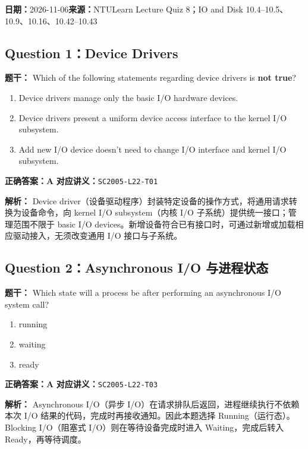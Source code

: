 \documentclass[11pt,a4paper,fontset=fandol]{ctexart}
\renewcommand{\exercisequestion}[2]{%
  \Needspace{5\baselineskip}%
  \subsection{#2}\label{exercise:#1}%
}
\renewcommand{\exercisemeta}[5]{%
  {\small\textbf{日期：}#2\quad\textbf{来源：}#3\par}%
}
\renewenvironment{checkedsolution}
  {\par\nopagebreak[4]\textbf{解析：}\ignorespaces}
  {\par}
\begin{document}
\exercisemeta
  {SC2005-HW08}
  {2026-11-06}
  {NTULearn Lecture Quiz 8；IO and Disk 10.4--10.5、10.9、10.16、10.42--10.43}
  {五道题已完成，并根据讲义与平台反馈核对}
  {是（2026-11-06）}

\exercisequestion{SC2005-HW08-Q01}{Question 1：Device Drivers}

\textbf{题干：} Which of the following statements regarding device drivers is \textbf{not true}?

\begin{enumerate}[label=\Alph*.,leftmargin=2.4em]
  \item Device drivers manage only the basic I/O hardware devices.
  \item Device drivers present a uniform device access interface to the kernel I/O subsystem.
  \item Add new I/O device doesn't need to change I/O interface and kernel I/O subsystem.
\end{enumerate}

\textbf{正确答案：A}\qquad
\textbf{对应讲义：}\texttt{SC2005-L22-T01}

\begin{checkedsolution}
Device driver（设备驱动程序）封装特定设备的操作方式，将通用请求转换为设备命令，向 kernel I/O subsystem（内核 I/O 子系统）提供统一接口；管理范围不限于 basic I/O devices。新增设备符合已有接口时，可通过新增或加载相应驱动接入，无须改变通用 I/O 接口与子系统。
\end{checkedsolution}

\exercisequestion{SC2005-HW08-Q02}{Question 2：Asynchronous I/O 与进程状态}

\textbf{题干：} Which state will a process be after performing an asynchronous I/O system call?

\begin{enumerate}[label=\Alph*.,leftmargin=2.4em]
  \item running
  \item waiting
  \item ready
\end{enumerate}

\textbf{正确答案：A}\qquad
\textbf{对应讲义：}\texttt{SC2005-L22-T03}

\begin{checkedsolution}
Asynchronous I/O（异步 I/O）在请求排队后返回，进程继续执行不依赖本次 I/O 结果的代码，完成时再接收通知。因此本题选择 Running（运行态）。Blocking I/O（阻塞式 I/O）则在等待设备完成时进入 Waiting，完成后转入 Ready，再等待调度。
\end{checkedsolution}
\end{document}
